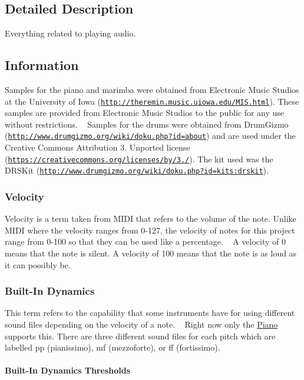 \subsection{Detailed Description}
Everything related to playing audio. 

\hypertarget{group___audio_AudioInfo}{}\subsection{Information}\label{group___audio_AudioInfo}
Samples for the piano and marimba were obtained from Electronic Music Studios at the University of Iowa (\href{http://theremin.music.uiowa.edu/MIS.html}{\tt http\+://theremin.\+music.\+uiowa.\+edu/\+M\+I\+S.\+html}). These samples are provided from Electronic Music Studios to the public for any use without restrictions. ~\newline
 Samples for the drums were obtained from Drum\+Gizmo (\href{http://www.drumgizmo.org/wiki/doku.php?id=about}{\tt http\+://www.\+drumgizmo.\+org/wiki/doku.\+php?id=about}) and are used under the Creative Commons Attribution 3. Unported license (\href{https://creativecommons.org/licenses/by/3.0/}{\tt https\+://creativecommons.\+org/licenses/by/3./}). The kit used was the D\+R\+S\+Kit (\href{http://www.drumgizmo.org/wiki/doku.php?id=kits:drskit}{\tt http\+://www.\+drumgizmo.\+org/wiki/doku.\+php?id=kits\+:drskit}).\hypertarget{group___audio_DefVel}{}\subsubsection{Velocity}\label{group___audio_DefVel}
Velocity is a term taken from M\+I\+DI that refers to the volume of the note. Unlike M\+I\+DI where the velocity ranges from 0-\/127, the velocity of notes for this project range from 0-\/100 so that they can be used like a percentage. ~\newline
 A velocity of 0 means that the note is silent. A velocity of 100 means that the note is as loud as it can possibly be.\hypertarget{group___audio_DefBID}{}\subsubsection{Built-\/\+In Dynamics}\label{group___audio_DefBID}
This term refers to the capability that some instruments have for using different sound files depending on the velocity of a note. ~\newline
 Right now only the \hyperlink{class_piano}{Piano} supports this. There are three different sound files for each pitch which are labelled pp (pianissimo), mf (mezzoforte), or ff (fortissimo).\hypertarget{group___audio_DefBIDThresh}{}\paragraph{Built-\/\+In Dynamics Thresholds}\label{group___audio_DefBIDThresh}
